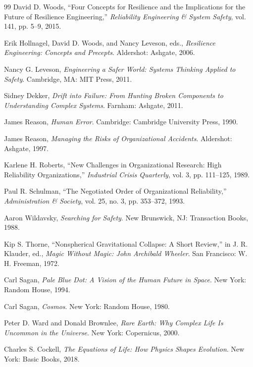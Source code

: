 \documentclass[11pt,oneside]{book}
\theoremstyle{definition}
\theoremstyle{remark}
\begin{document}
\begin{thebibliography}{99}
 David D. Woods, ``Four Concepts for Resilience and the Implications for the Future of Resilience
  Engineering,'' \emph{Reliability Engineering \& System Safety}, vol. 141, pp. 5--9, 2015.

 Erik Hollnagel, David D. Woods, and Nancy Leveson, eds., \emph{Resilience Engineering: Concepts
  and Precepts}. Aldershot: Ashgate, 2006.

 Nancy G. Leveson, \emph{Engineering a Safer World: Systems Thinking Applied to Safety}.
  Cambridge, MA: MIT Press, 2011.

 Sidney Dekker, \emph{Drift into Failure: From Hunting Broken Components to Understanding Complex
  Systems}. Farnham: Ashgate, 2011.

 James Reason, \emph{Human Error}. Cambridge: Cambridge University Press, 1990.

 James Reason, \emph{Managing the Risks of Organizational Accidents}. Aldershot: Ashgate, 1997.

 Karlene H. Roberts, ``New Challenges in Organizational Research: High Reliability
  Organizations,'' \emph{Industrial Crisis Quarterly}, vol. 3, pp. 111--125, 1989.

 Paul R. Schulman, ``The Negotiated Order of Organizational Reliability,'' \emph{Administration
  \& Society}, vol. 25, no. 3, pp. 353--372, 1993.

 Aaron Wildavsky, \emph{Searching for Safety}. New Brunswick, NJ: Transaction Books, 1988.

 Kip S. Thorne, ``Nonspherical Gravitational Collapse: A Short Review,'' in J. R. Klauder, ed.,
  \emph{Magic Without Magic: John Archibald Wheeler}. San Francisco: W. H. Freeman, 1972.

 Carl Sagan, \emph{Pale Blue Dot: A Vision of the Human Future in Space}. New York: Random House,
  1994.

 Carl Sagan, \emph{Cosmos}. New York: Random House, 1980.

 Peter D. Ward and Donald Brownlee, \emph{Rare Earth: Why Complex Life Is Uncommon in the
  Universe}. New York: Copernicus, 2000.

 Charles S. Cockell, \emph{The Equations of Life: How Physics Shapes Evolution}. New York: Basic
  Books, 2018.


\end{thebibliography}
\end{document}
